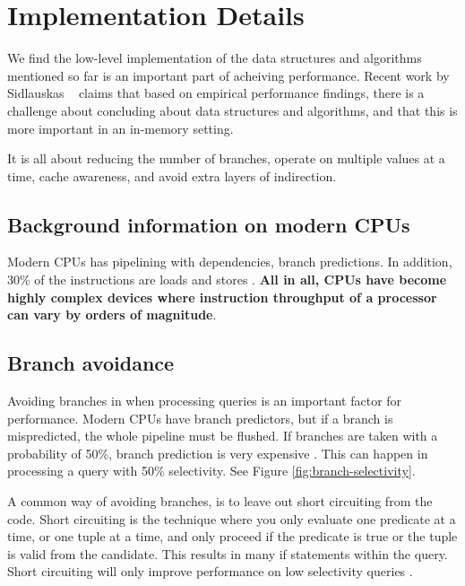\chapter{Implementation Details}
\label{chap:Implementation Details}
We find the low-level implementation of the data structures and algorithms mentioned so far is an important part of acheiving performance. Recent work by Sidlauskas \ea~\cite{Sidlauskas2014-ef} claims that based on empirical performance findings, there is a challenge about concluding about data structures and algorithms, and that this is more important in an in-memory setting.

It is all about reducing the number of branches, operate on multiple values at a time, cache awareness, and avoid extra layers of indirection.
\newpage

\section{Background information on modern CPUs}
\label{sec:Background information on modern CPUs}
Modern CPUs has pipelining with dependencies, branch predictions. In addition, 30\% of the instructions are loads and stores \cite{Boncz2005-wj}. \textbf{All in all, CPUs have become highly complex devices where instruction throughput of a processor can vary by orders of magnitude}. 

\section{Branch avoidance}
\label{sec:Branch avoidance}
Avoiding branches in when processing queries is an important factor for performance. Modern CPUs have branch predictors, but if a branch is mispredicted, the whole pipeline must be flushed. If branches are taken with a probability of 50\%, branch prediction is very expensive \cite{Neumann2011-uq}. This can happen in processing a query with 50\% selectivity. See Figure \ref{fig:branch-selectivity}.

A common way of avoiding branches, is to leave out short circuiting from the code. Short circuiting is the technique where you only evaluate one predicate at a time, or one tuple at a time, and only proceed if the predicate is true or the tuple is valid from the candidate. This results in many if statements within the query. Short circuiting will only improve performance on low selectivity queries \cite{Johnson2008-cp}.

